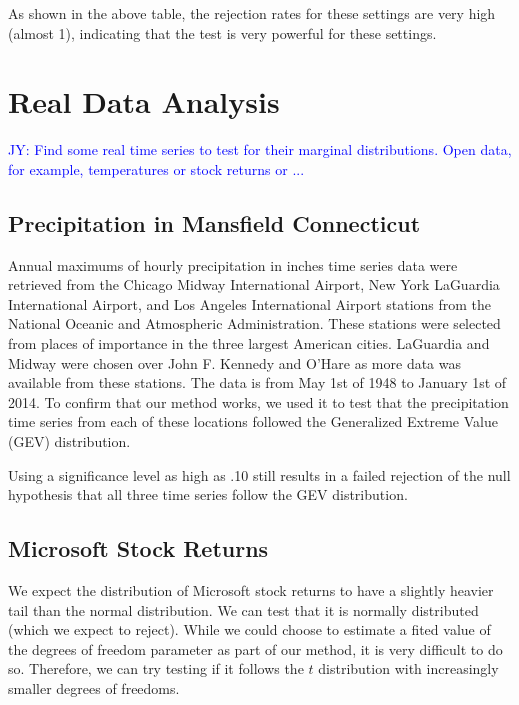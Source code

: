 \documentclass[12pt, letterpaper]{article}
\newcommand{\jy}[1]{\textcolor{blue}{JY: #1}}
\newcommand{\mc}[1]{\textcolor{green}{MC: (#1)}}
\begin{document}
As shown in the above table, the rejection rates for these settings are very 
high (almost 1), indicating that the test is very powerful for these settings.

\section{Real Data Analysis}



\jy{Find some real time series to test for their marginal distributions. Open
  data, for example, temperatures or stock returns or ...}

\subsection{Precipitation in Mansfield Connecticut}
Annual maximums of hourly precipitation in inches time series data were 
retrieved 
from the Chicago Midway International Airport, New York LaGuardia International 
Airport,
and Los Angeles International Airport stations from the 
National Oceanic and Atmospheric Administration. These stations were selected 
from places of importance in the three largest American cities. LaGuardia and
Midway were chosen over John F. Kennedy and O'Hare as more data was available
from these stations. The data is from
May 1st of 1948 to January 1st of 2014. To confirm that our method works, we 
used it to test that
the precipitation time series from each of these locations followed the 
Generalized Extreme Value (GEV) distribution. 



Using a significance level as high as .10 still results in a failed rejection
of the null hypothesis that all three time series follow the GEV distribution.

\subsection{Microsoft Stock Returns}


We expect the distribution of Microsoft stock returns to have a slightly
heavier tail than the normal distribution. We can test that it is normally
distributed (which we expect to reject).  While we 
could choose to estimate a fited value of the degrees of freedom parameter as
part of our method, it is very difficult to do so. Therefore, we can try testing 
if it follows
the $t$ distribution with increasingly smaller degrees of freedoms.
\end{document}
